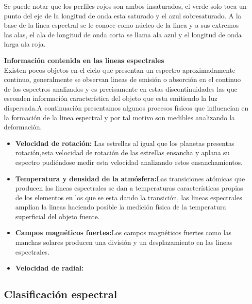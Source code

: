 \noindent Se puede notar que los perfiles rojos son ambos insaturados, el verde solo toca un punto del eje de la longitud de onda esta saturado y el azul sobresaturado. A la base de la linea espectral se le conoce como núcleo de la linea y a sus extremos las alas, el ala de longitud de onda corta se llama ala azul y el longitud de onda larga ala roja.
\newpage




\noindent \textbf{Información contenida en las lineas espectrales}\\

Existen pocos objetos en el cielo que presentan un espectro aproximadamente continuo, generalmente se observan lineas de emisión o absorción en el continuo de los espectros analizados y es precisamente en estas discontinuidades las que esconden información característica del objeto que esta emitiendo la luz dispersada.A continuación presentamos algunos procesos físicos que influencian en la formación de la linea espectral y por tal motivo son medibles analizando la deformación.

\begin{itemize}
    \item \textbf{Velocidad de rotación:} Las estrellas al igual que los planetas presentas rotación,esta velocidad de rotación de las estrellas ensancha y aplana su espectro pudiéndose medir esta velocidad analizando  estos ensanchamientos.
    \item \textbf{Temperatura y densidad de la atmósfera:}Las transiciones atómicas que producen las lineas espectrales se dan a temperaturas características propias de los elementos en los que se esta dando la transición, las lineas espectrales amplían la lineas haciendo posible la medición física de la temperatura superficial del objeto fuente.
    \item \textbf{Campos magnéticos fuertes:}Los campos magnéticos fuertes como las manchas solares producen una división y un desplazamiento en las lineas espectrales.
    \item \textbf{Velocidad de radial:}
    
    
    
    
    
    
    
    
\end{itemize}{}





\subsection {Clasificación espectral}



